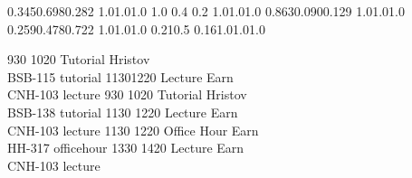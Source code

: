
\noindent{}

\setslotsize{3.1cm}{0.5cm}
\settextframe{0.8mm}




    {0.345}{0.698}{0.282} {1.0}{1.0}{1.0}
    {1.0} {0.4} {0.2} {1.0}{1.0}{1.0}
 {0.863}{0.090}{0.129} {1.0}{1.0}{1.0}
   {0.259}{0.478}{0.722} {1.0}{1.0}{1.0}
       {0.21}{0.5} {0.16}{1.0}{1.0}{1.0}

\begin{timetable}
   {930} {1020} {Tutorial}       {Hristov\\BSB-115} {}      {tutorial}
   {1130}{1220} {Lecture}        {Earn\\CNH-103}    {}      {lecture}
   {930} {1020} {Tutorial}       {Hristov\\BSB-138} {}      {tutorial}
   {1130} {1220} {Lecture}        {Earn\\CNH-103}   {}      {lecture}
   {1130} {1220} {Office Hour}    {Earn\\HH-317}    {}      {officehour}
   {1330} {1420} {Lecture}        {Earn\\CNH-103}   {}      {lecture}
\end{timetable}
